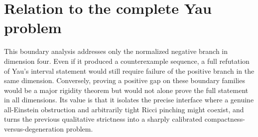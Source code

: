 \section{Relation to the complete Yau problem}

This boundary analysis addresses only the normalized negative branch in dimension four.  Even if it produced a counterexample sequence, a full refutation of Yau's interval statement would still require failure of the positive branch in the same dimension.  Conversely, proving a positive gap on these boundary families would be a major rigidity theorem but would not alone prove the full statement in all dimensions.  Its value is that it isolates the precise interface where a genuine all-Einstein obstruction and arbitrarily tight Ricci pinching might coexist, and turns the previous qualitative strictness into a sharply calibrated compactness-versus-degeneration problem.
